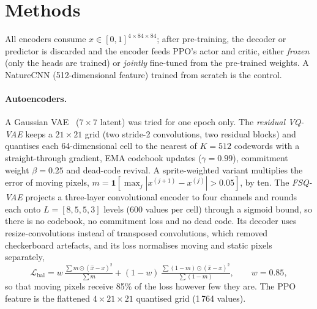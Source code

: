 \documentclass[runningheads]{llncs}
\begin{document}
\section{Methods}
\label{sec:methods}

All encoders consume $x\in[0,1]^{4\times84\times84}$; after pre-training, the decoder or
predictor is discarded and the encoder feeds PPO's actor and critic, either \emph{frozen}
(only the heads are trained) or \emph{jointly} fine-tuned from the pre-trained weights. A
NatureCNN (512-dimensional feature) trained from scratch is the control.

\paragraph{Autoencoders.}
A Gaussian VAE~\cite{kingma2014vae} ($7\times7$ latent) was tried for one epoch only. The \emph{residual VQ-VAE} keeps a $21\times21$ grid (two
stride-2 convolutions, two residual blocks) and quantises each 64-dimensional cell to the
nearest of $K=512$ codewords with a straight-through gradient, EMA codebook updates
($\gamma=0.99$), commitment weight $\beta=0.25$ and dead-code revival. A sprite-weighted
variant multiplies the error of moving pixels,
$m=\mathbf{1}[\max_j|x^{(j+1)}-x^{(j)}|>0.05]$, by ten. The \emph{FSQ-VAE} projects a
three-layer convolutional encoder to four channels and rounds each onto $L=[8,5,5,3]$ levels
(600 values per cell) through a sigmoid bound, so there is no codebook, no commitment loss
and no dead code. Its decoder uses resize-convolutions instead of transposed convolutions,
which removed checkerboard artefacts, and its loss normalises
moving and static pixels separately,
\begin{equation}
  \mathcal{L}_{\text{bal}} = w\,\tfrac{\sum m\odot(\hat x-x)^2}{\sum m}
  +(1-w)\,\tfrac{\sum (1-m)\odot(\hat x-x)^2}{\sum (1-m)},\qquad w=0.85,
\end{equation}
so that moving pixels receive 85\% of the loss however few they are. The PPO feature is the
flattened $4\times21\times21$ quantised grid (1\,764 values).
\end{document}
